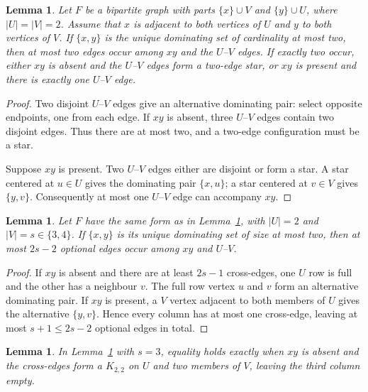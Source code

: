 \documentclass[11pt]{article}
\newtheorem{lemma}[theorem]{Lemma}
\theoremstyle{definition}
\theoremstyle{remark}
\begin{document}
\begin{lemma}\label{lem:six}
Let $F$ be a bipartite graph with parts $\{x\}\cup V$ and $\{y\}\cup U$,
where $|U|=|V|=2$. Assume that $x$ is adjacent to both vertices of $U$ and
$y$ to both vertices of $V$. If $\{x,y\}$ is the unique dominating set of
cardinality at most two, then at most two edges occur among $xy$ and the
$U$--$V$ edges. If exactly two occur, either $xy$ is absent and the
$U$--$V$ edges form a two-edge star, or $xy$ is present and there is exactly
one $U$--$V$ edge.
\end{lemma}

\begin{proof}
Two disjoint $U$--$V$ edges give an alternative dominating pair: select
opposite endpoints, one from each edge. If $xy$ is absent, three
$U$--$V$ edges contain two disjoint edges. Thus there are at most two, and a
two-edge configuration must be a star.

Suppose $xy$ is present. Two $U$--$V$ edges either are disjoint or form a
star. A star centered at $u\in U$ gives the dominating pair $\{x,u\}$;
a star centered at $v\in V$ gives $\{y,v\}$. Consequently at most one
$U$--$V$ edge can accompany $xy$.
\end{proof}

\begin{lemma}\label{lem:seven}
Let $F$ have the same form as in Lemma~\ref{lem:six}, with $|U|=2$ and
$|V|=s\in\{3,4\}$. If $\{x,y\}$ is its unique dominating set of size at
most two, then at most $2s-2$ optional edges occur among $xy$ and $U$--$V$.
\end{lemma}

\begin{proof}
If $xy$ is absent and there are at least $2s-1$ cross-edges, one $U$ row
is full and the other has a neighbour $v$. The full row vertex $u$ and $v$
form an alternative dominating pair. If $xy$ is present, a $V$ vertex
adjacent to both members of $U$ gives the alternative $\{y,v\}$.
Hence every column has at most one cross-edge, leaving at most
$s+1\le2s-2$ optional edges in total.
\end{proof}

\begin{lemma}\label{lem:seven-equality}
In Lemma~\ref{lem:seven} with $s=3$, equality holds exactly when $xy$ is
absent and the cross-edges form a $K_{2,2}$ on $U$ and two members of $V$,
leaving the third column empty.
\end{lemma}
\end{document}
